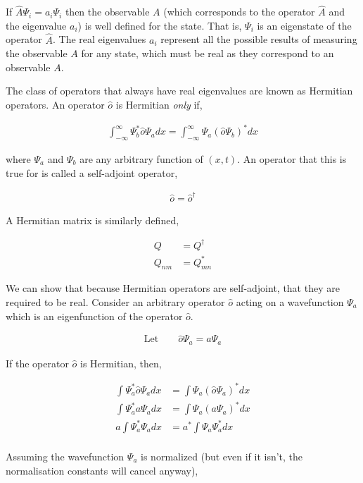 \documentclass[11pt]{amsart}
\begin{document}
If $\hat{A}\Psi_i = a_i\Psi_i$ then the observable $A$ (which corresponds to the operator $\hat{A}$ and the eigenvalue $a_i$) is well defined for the state. That is, $\Psi_i$ is an eigenstate of the operator $\hat{A}$. The real eigenvalues $a_i$ represent all the possible results of measuring the observable $A$ for any state, which must be real as they correspond to an observable $A$.

The class of operators that always have real eigenvalues are known as Hermitian operators. An operator $\hat{o}$ is Hermitian \textit{only} if,

\begin{align*}
  \int_{-\infty}^{\infty} \Psi_b^*\hat{o}\Psi_a dx = \int_{-\infty}^{\infty} \Psi_a(\hat{o}\Psi_b)^* dx
\end{align*}

where $\Psi_a$ and $\Psi_b$ are any arbitrary function of $(x, t)$. An operator that this is true for is called a self-adjoint operator,

\begin{align*}
  \hat{o} = \hat{o}^{\dagger}
\end{align*}

A Hermitian matrix is similarly defined,

\begin{align*}
  Q &= Q^{\dagger} \\
  Q_{nm} &= Q_{mn}^*
\end{align*}

We can show that because Hermitian operators are self-adjoint, that they are required to be real. Consider an arbitrary operator $\hat{o}$ acting on a wavefunction $\Psi_a$ which is an eigenfunction of the operator $\hat{o}$.

\begin{align*}
  \text{Let} \qquad \hat{o} \Psi_a = a \Psi_a
\end{align*}

If the operator $\hat{o}$ is Hermitian, then,

\begin{align*}
  \int\Psi_a^*\hat{o}\Psi_a dx &= \int\Psi_a(\hat{o}\Psi_a)^* dx \\
  \int\Psi_a^* a \Psi_a dx &= \int\Psi_a(a \Psi_a)^* dx \\
  a \int\Psi_a^* \Psi_a dx &= a^* \int\Psi_a \Psi_a^* dx \\
\end{align*}

Assuming the wavefunction $\Psi_a$ is normalized (but even if it isn't, the normalisation constants will cancel anyway),
\end{document}
